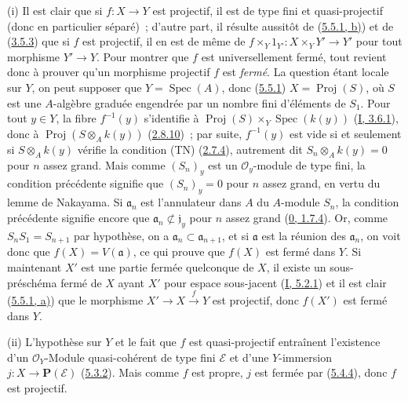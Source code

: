 (i) Il est clair que si $f:X\to Y$ est projectif, il est de type fini et
quasi-projectif (donc en particulier séparé)~; d'autre part, il résulte
aussitôt de (\hyperref[II.5.5.1-fr]{5.5.1, b)}) et de
(\hyperref[II.3.5.3-fr]{3.5.3}) que si $f$ est projectif, il en est de même de
$f\times_Y1_{Y'}:X\times_YY'\to Y'$ pour tout morphisme $Y'\to Y$. Pour
montrer que $f$ est universellement fermé, tout revient donc à prouver qu'un
morphisme projectif $f$ est \emph{fermé}. La question étant locale sur $Y$, on
peut supposer que $Y=\operatorname{Spec}(A)$, donc
(\hyperref[II.5.5.1-fr]{5.5.1}) $X=\operatorname{Proj}(S)$, où $S$ est une
$A$-algèbre graduée engendrée par un nombre fini d'éléments de $S_1$. Pour
tout $y\in Y$, la fibre $f^{-1}(y)$ s'identifie à
$\operatorname{Proj}(S)\times_Y\operatorname{Spec}(k(y))$
(\hyperref[I.3.6.1-fr]{I, 3.6.1}), donc à
$\operatorname{Proj}(S\otimes_Ak(y))$
(\hyperref[II.2.8.10-fr]{2.8.10})~; par suite, $f^{-1}(y)$ est vide si et
seulement si $S\otimes_Ak(y)$ vérifie la condition (TN)
(\hyperref[II.2.7.4-fr]{2.7.4}), autrement dit $S_n\otimes_Ak(y)=0$ pour $n$
assez grand. Mais comme $(S_n)_y$ est un $\mathcal{O}_y$-module de type fini,
la condition précédente signifie que $(S_n)_y=0$ pour $n$ assez grand, en
vertu du lemme de Nakayama. Si $\mathfrak a_n$ est l'annulateur dans $A$ du
$A$-module $S_n$, la condition précédente signifie encore que
$\mathfrak a_n\not\subset\mathfrak j_y$ pour $n$ assez grand
(\hyperref[0.1.7.4-fr]{0, 1.7.4}). Or, comme $S_nS_1=S_{n+1}$ par hypothèse,
on a $\mathfrak a_n\subset\mathfrak a_{n+1}$, et si $\mathfrak a$ est la
réunion des $\mathfrak a_n$, on voit donc que $f(X)=V(\mathfrak a)$, ce qui
prouve que $f(X)$ est fermé dans $Y$. Si maintenant $X'$ est une partie
fermée quelconque de $X$, il existe un sous-préschéma fermé de $X$ ayant $X'$
pour espace sous-jacent (\hyperref[I.5.2.1-fr]{I, 5.2.1}) et il est clair
(\hyperref[II.5.5.1-fr]{5.5.1, a)}) que le morphisme
$X'\to X\xrightarrow{f}Y$ est projectif, donc $f(X')$ est fermé dans $Y$.

(ii) L'hypothèse sur $Y$ et le fait que $f$ est quasi-projectif entraînent
l'existence d'un $\mathcal{O}_Y$-Module quasi-cohérent de type fini
$\mathcal{E}$ et d'une $Y$-immersion $j:X\to\mathbf{P}(\mathcal{E})$
(\hyperref[II.5.3.2-fr]{5.3.2}). Mais comme $f$ est propre, $j$ est fermée par
(\hyperref[II.5.4.4-fr]{5.4.4}), donc $f$ est projectif.

